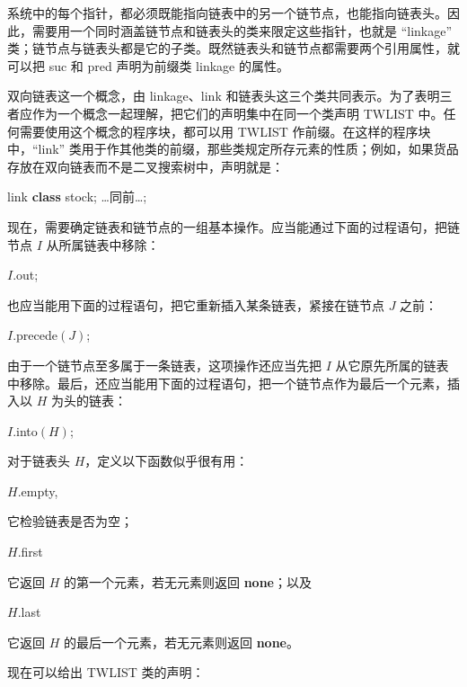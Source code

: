 系统中的每个指针，都必须既能指向链表中的另一个链节点，也能指向链表头。因此，需要用一个同时涵盖链节点和链表头的类来限定这些指针，也就是 ``linkage'' 类；链节点与链表头都是它的子类。既然链表头和链节点都需要两个引用属性，就可以把 suc 和 pred 声明为前缀类 linkage 的属性。

双向链表这一个概念，由 linkage、link 和链表头这三个类共同表示。为了表明三者应作为一个概念一起理解，把它们的声明集中在同一个类声明 TWLIST 中。任何需要使用这个概念的程序块，都可以用 TWLIST 作前缀。在这样的程序块中，``link'' 类用于作其他类的前缀，那些类规定所存元素的性质；例如，如果货品存放在双向链表而不是二叉搜索树中，声明就是：

\quad link \textbf{class} stock; \dots 同前\dots;

现在，需要确定链表和链节点的一组基本操作。应当能通过下面的过程语句，把链节点 $I$ 从所属链表中移除：

\quad $I$.out;

\noindent
也应当能用下面的过程语句，把它重新插入某条链表，紧接在链节点 $J$ 之前：

\quad $I$.precede$(J)$;

\noindent
由于一个链节点至多属于一条链表，这项操作还应当先把 $I$ 从它原先所属的链表中移除。最后，还应当能用下面的过程语句，把一个链节点作为最后一个元素，插入以 $H$ 为头的链表：

\quad $I$.into$(H)$;

对于链表头 $H$，定义以下函数似乎很有用：

\quad $H$.empty,

\noindent
它检验链表是否为空；

\quad $H$.first

\noindent
它返回 $H$ 的第一个元素，若无元素则返回 \textbf{none}；以及

\quad $H$.last

\noindent
它返回 $H$ 的最后一个元素，若无元素则返回 \textbf{none}。

现在可以给出 TWLIST 类的声明：

